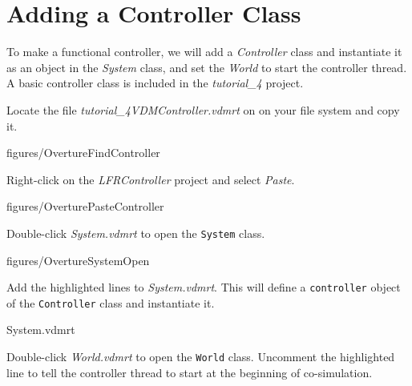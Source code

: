 \documentclass[11pt,a4paper]{../tutorial}
\begin{document}
\newpage
\section{Adding a Controller Class}

To make a functional controller, we will add a \emph{Controller} class and instantiate it as an object in the \emph{System} class, and set the \emph{World} to start the controller thread. A basic controller class is included in the \emph{tutorial\_4} project.

\begin{instructions}
\item Locate the file \emph{tutorial\_4\pathsep{}VDM\pathsep{}Controller.vdmrt} on on your file system and copy it.

    \begin{annotation}[width=0.8\linewidth]{figures/OvertureFindController}
    \end{annotation}

\item Right-click on the \emph{LFRController} project and select \emph{Paste}.

    \begin{annotation}[width=0.99\linewidth,trim=0 335 0 0,clip]{figures/OverturePasteController}
    \end{annotation}

\item Double-click \emph{System.vdmrt} to open the \texttt{System} class.

    \begin{annotation}[width=0.98\linewidth,trim=0 335 0 0,clip]{figures/OvertureSystemOpen}
    \end{annotation}

\newpage
\item \label{step:system} Add the highlighted lines to \emph{System.vdmrt}. This will define a \texttt{controller} object of the \texttt{Controller} class and instantiate it.

    \bigskip
    
    {System.vdmrt}

\item \label{step:world} Double-click \emph{World.vdmrt} to open the \texttt{World} class. Uncomment the highlighted line to tell the controller thread to start at the beginning of co-simulation.


\end{instructions}
\end{document}
